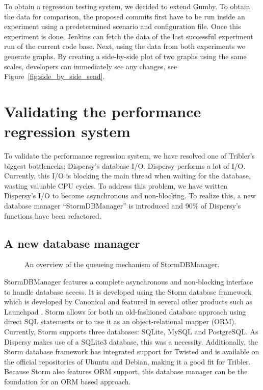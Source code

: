 To obtain a regression testing system, we decided to extend Gumby.
To obtain the data for comparison, the proposed commits first have to be run inside an experiment using a predetermined scenario and configuration file.
Once this experiment is done, Jenkins can fetch the data of the last successful experiment run of the current code base.
Next, using the data from both experiments we generate graphs.
By creating a side-by-side plot of two graphs using the same scales, developers can immediately see any changes, see Figure~\ref{fig:side_by_side_send}.

\section{Validating the performance regression system}

To validate the performance regression system, we have resolved one of Tribler's biggest bottlenecks: Dispersy's database I/O.
Dispersy performs a lot of I/O.
Currently, this I/O is blocking the main thread when waiting for the database, wasting valuable CPU cycles.
To address this problem, we have written Dispersy's I/O to become asynchronous and non-blocking.
To realize this, a new database manager \enquote{StormDBManager} is introduced and 90\% of Dispersy's functions have been refactored.

\subsection{A new database manager}

\begin{figure}[h]
	\caption{An overview of the queueing mechanism of StormDBManager.}
	\label{fig:storm_db_worker}
\end{figure}

StormDBManager features a complete asynchronous and non-blocking interface to handle database access.
It is developed using the Storm database framework which is developed by Canonical and featured in several other products such as Launchpad \cite{canonical2011storm}.
Storm allows for both an old-fashioned database approach using direct SQL statements or to use it as an object-relational mapper (ORM).
Currently, Storm supports three databases: SQLite, MySQL and PostgreSQL.
As Dispersy makes use of a SQLite3 database, this was a necessity.
Additionally, the Storm database framework has integrated support for Twisted and is available on the official repositories of Ubuntu and Debian, making it a good fit for Tribler.
Because Storm also features ORM support, this database manager can be the foundation for an ORM based approach.

